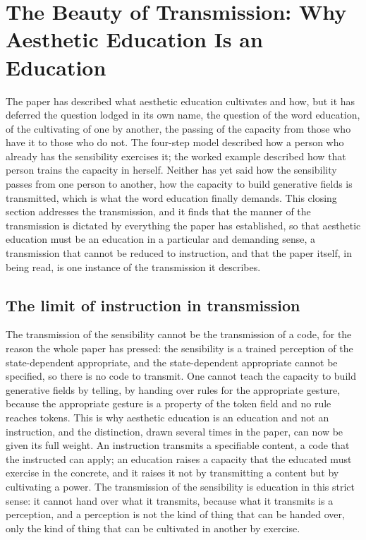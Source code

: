 \section{The Beauty of Transmission: Why Aesthetic Education Is an Education}
\label{p22:sec:transmission}

\noindent
The paper has described what aesthetic education cultivates and how, but it has deferred the question lodged in its own name, the question of the word education, of the cultivating of one by another, the passing of the capacity from those who have it to those who do not. The four-step model described how a person who already has the sensibility exercises it; the worked example described how that person trains the capacity in herself. Neither has yet said how the sensibility passes from one person to another, how the capacity to build generative fields is transmitted, which is what the word education finally demands. This closing section addresses the transmission, and it finds that the manner of the transmission is dictated by everything the paper has established, so that aesthetic education must be an education in a particular and demanding sense, a transmission that cannot be reduced to instruction, and that the paper itself, in being read, is one instance of the transmission it describes.

\subsection{The limit of instruction in transmission}
\label{p22:sub:trans-not-instruction}

The transmission of the sensibility cannot be the transmission of a code, for the reason the whole paper has pressed: the sensibility is a trained perception of the state-dependent appropriate, and the state-dependent appropriate cannot be specified, so there is no code to transmit. One cannot teach the capacity to build generative fields by telling, by handing over rules for the appropriate gesture, because the appropriate gesture is a property of the token field and no rule reaches tokens. This is why aesthetic education is an education and not an instruction, and the distinction, drawn several times in the paper, can now be given its full weight. An instruction transmits a specifiable content, a code that the instructed can apply; an education raises a capacity that the educated must exercise in the concrete, and it raises it not by transmitting a content but by cultivating a power. The transmission of the sensibility is education in this strict sense: it cannot hand over what it transmits, because what it transmits is a perception, and a perception is not the kind of thing that can be handed over, only the kind of thing that can be cultivated in another by exercise.

